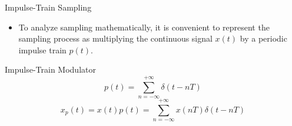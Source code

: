 \begin{frame}{Impulse-Train Sampling}
  \begin{itemize}
    \item To analyze sampling mathematically, it is convenient to represent the sampling process as multiplying the continuous signal $x(t)$ by a periodic impulse train $p(t)$.
  \end{itemize}

  \begin{conceptbox}{Impulse-Train Modulator}
    \vspace{-0.2cm}
    \begin{equation*}
      p(t) = \sum_{n=-\infty}^{+\infty} \delta(t-nT)
    \end{equation*}
    \begin{equation*}
      x_p(t) = x(t)p(t) = \sum_{n=-\infty}^{+\infty} x(nT)\delta(t-nT)
    \end{equation*}
  \end{conceptbox}

  \begin{center}
  \end{center}
\end{frame}

